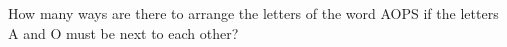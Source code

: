 How many ways are there to arrange the letters of the word AOPS if the letters A and O must be next to each other?
